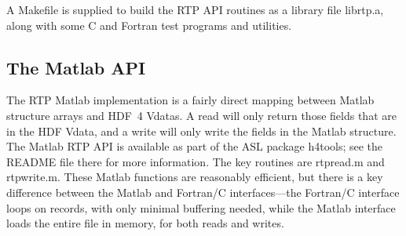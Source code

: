 \documentclass[11pt]{article}
\begin{document}
A Makefile is supplied to build the RTP API routines as a library
file librtp.a, along with some C and Fortran test programs and
utilities.

\subsection{The Matlab API}

The RTP Matlab implementation is a fairly direct mapping between
Matlab structure arrays and HDF~4 Vdatas.  A read will only return
those fields that are in the HDF Vdata, and a write will only write
the fields in the Matlab structure.  The Matlab RTP API is available
as part of the ASL package h4tools; see the README file there for
more information.  The key routines are rtpread.m and rtpwrite.m.
These Matlab functions are reasonably efficient, but there is a key
difference between the Matlab and Fortran/C interfaces---the
Fortran/C interface loops on records, with only minimal buffering
needed, while the Matlab interface loads the entire file in memory,
for both reads and writes.

% 
% 

\newpage
\end{document}
